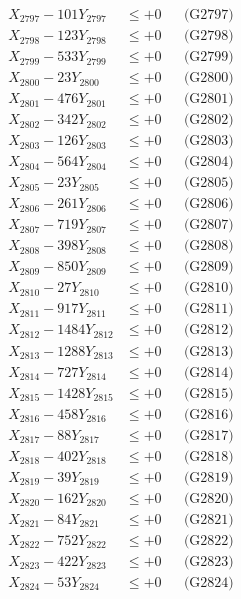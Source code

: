 \documentclass[a4paper,10pt]{article}
\begin{document}
{\begin{align}
X_{2797} - 101Y_{2797} &\leq +0 && \text{(G2797)} \\
X_{2798} - 123Y_{2798} &\leq +0 && \text{(G2798)} \\
X_{2799} - 533Y_{2799} &\leq +0 && \text{(G2799)} \\
X_{2800} - 23Y_{2800} &\leq +0 && \text{(G2800)} \\
\allowbreak
X_{2801} - 476Y_{2801} &\leq +0 && \text{(G2801)} \\
X_{2802} - 342Y_{2802} &\leq +0 && \text{(G2802)} \\
X_{2803} - 126Y_{2803} &\leq +0 && \text{(G2803)} \\
X_{2804} - 564Y_{2804} &\leq +0 && \text{(G2804)} \\
X_{2805} - 23Y_{2805} &\leq +0 && \text{(G2805)} \\
X_{2806} - 261Y_{2806} &\leq +0 && \text{(G2806)} \\
X_{2807} - 719Y_{2807} &\leq +0 && \text{(G2807)} \\
X_{2808} - 398Y_{2808} &\leq +0 && \text{(G2808)} \\
X_{2809} - 850Y_{2809} &\leq +0 && \text{(G2809)} \\
X_{2810} - 27Y_{2810} &\leq +0 && \text{(G2810)} \\
\allowbreak
X_{2811} - 917Y_{2811} &\leq +0 && \text{(G2811)} \\
X_{2812} - 1484Y_{2812} &\leq +0 && \text{(G2812)} \\
X_{2813} - 1288Y_{2813} &\leq +0 && \text{(G2813)} \\
X_{2814} - 727Y_{2814} &\leq +0 && \text{(G2814)} \\
X_{2815} - 1428Y_{2815} &\leq +0 && \text{(G2815)} \\
X_{2816} - 458Y_{2816} &\leq +0 && \text{(G2816)} \\
X_{2817} - 88Y_{2817} &\leq +0 && \text{(G2817)} \\
X_{2818} - 402Y_{2818} &\leq +0 && \text{(G2818)} \\
X_{2819} - 39Y_{2819} &\leq +0 && \text{(G2819)} \\
X_{2820} - 162Y_{2820} &\leq +0 && \text{(G2820)} \\
\allowbreak
X_{2821} - 84Y_{2821} &\leq +0 && \text{(G2821)} \\
X_{2822} - 752Y_{2822} &\leq +0 && \text{(G2822)} \\
X_{2823} - 422Y_{2823} &\leq +0 && \text{(G2823)} \\
X_{2824} - 53Y_{2824} &\leq +0 && \text{(G2824)} \\

\end{align}}
\end{document}
